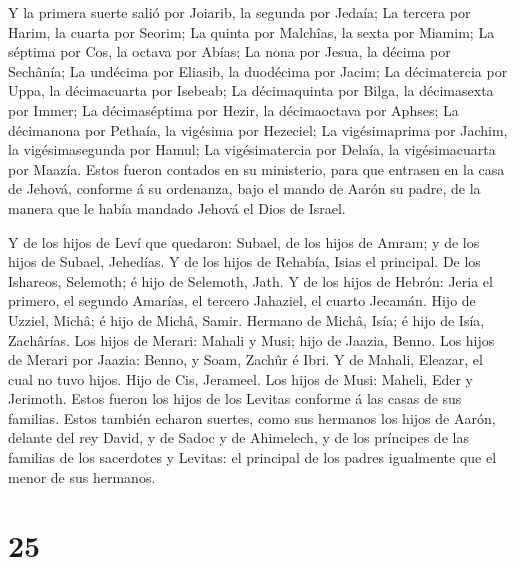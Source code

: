  Y la primera suerte salió por Joiarib, la segunda por
Jedaía;  La tercera por Harim, la cuarta por Seorim;
 La quinta por Malchîas, la sexta por Miamim; 
La séptima por Cos, la octava por Abías;  La nona por
Jesua, la décima por Sechânía;  La undécima por Eliasib, la
duodécima por Jacim;  La décimatercia por Uppa, la
décimacuarta por Isebeab;  La décimaquinta por Bilga, la
décimasexta por Immer;  La décimaséptima por Hezir, la
décimaoctava por Aphses;  La décimanona por Pethaía, la
vigésima por Hezeciel;  La vigésimaprima por Jachim, la
vigésimasegunda por Hamul;  La vigésimatercia por Delaía,
la vigésimacuarta por Maazía.  Estos fueron contados en su
ministerio, para que entrasen en la casa de Jehová, conforme á su
ordenanza, bajo el mando de Aarón su padre, de la manera que le había
mandado Jehová el Dios de Israel.

 Y de los hijos de Leví que quedaron: Subael, de los hijos
de Amram; y de los hijos de Subael, Jehedías.  Y de los
hijos de Rehabía, Isias el principal.  De los Ishareos,
Selemoth; é hijo de Selemoth, Jath.  Y de los hijos de
Hebrón: Jeria el primero, el segundo Amarías, el tercero Jahaziel, el
cuarto Jecamán.  Hijo de Uzziel, Michâ; é hijo de Michâ,
Samir.  Hermano de Michâ, Isía; é hijo de Isía, Zachârías.
 Los hijos de Merari: Mahali y Musi; hijo de Jaazia, Benno.
 Los hijos de Merari por Jaazia: Benno, y Soam, Zachûr é
Ibri.  Y de Mahali, Eleazar, el cual no tuvo hijos.
 Hijo de Cis, Jerameel.  Los hijos de Musi:
Maheli, Eder y Jerimoth. Estos fueron los hijos de los Levitas conforme
á las casas de sus familias.  Estos también echaron
suertes, como sus hermanos los hijos de Aarón, delante del rey David, y
de Sadoc y de Ahimelech, y de los príncipes de las familias de los
sacerdotes y Levitas: el principal de los padres igualmente que el menor
de sus hermanos.

\hypertarget{section-24}{%
\section{25}\label{section-24}}

